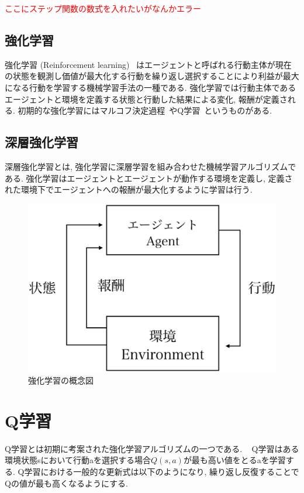 \textcolor{red}{ここにステップ関数の数式を入れたいがなんかエラー}


\subsection{強化学習}

強化学習 (Reinforcement learning) ~\cite{ReinforcementLearning}はエージェントと呼ばれる行動主体が現在の状態を観測し価値が最大化する行動を繰り返し選択することにより利益が最大になる行動を学習する機械学習手法の一種である.
強化学習では行動主体であるエージェントと環境を定義する状態と行動した結果による変化, 報酬が定義される.
初期的な強化学習にはマルコフ決定過程~\cite{ReinforcementLearning}やQ学習~\cite{QL}というものがある.

\subsection{深層強化学習}

深層強化学習とは, 強化学習に深層学習を組み合わせた機械学習アルゴリズムである.
強化学習はエージェントとエージェントが動作する環境を定義し, 定義された環境下でエージェントへの報酬が最大化するように学習は行う.

\begin{figure}[H]
    \centering
    \includegraphics[clip,width = 12.0cm]{assets/reinforcement_learning.eps}
    \caption{強化学習の概念図}  \label{sample}
\end{figure}

\section{Q学習}

Q学習とは初期に考案された強化学習アルゴリズムの一つである. ~\cite{QL}
Q学習はある環境状態sにおいて行動aを選択する場合$ Q(s, a)$が最も高い値をとるaを学習する. Q学習における一般的な更新式は以下のようになり, 繰り返し反復することで
Qの値が最も高くなるようにする.


